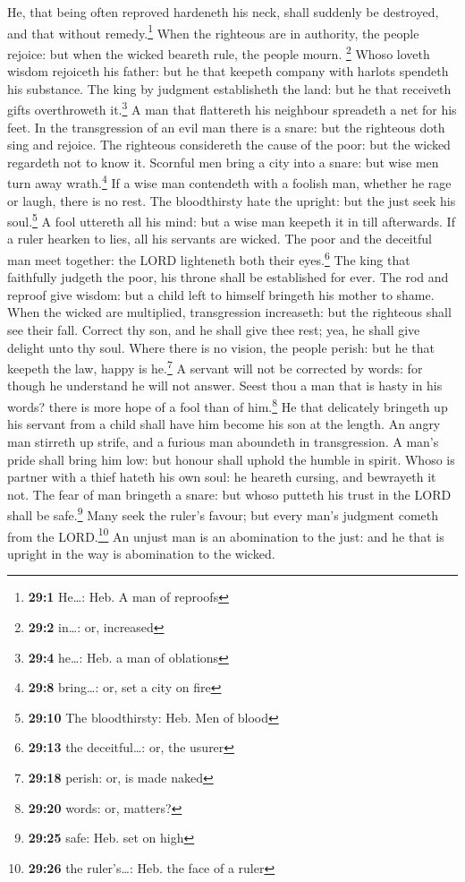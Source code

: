  He, that being often reproved hardeneth his neck, shall
suddenly be destroyed, and that without remedy.\footnote{\textbf{29:1}
  He\ldots: Heb. A man of reproofs}  When the righteous
are in authority, the people rejoice: but when the wicked beareth rule,
the people mourn. \footnote{\textbf{29:2} in\ldots: or, increased}
 Whoso loveth wisdom rejoiceth his father: but he that
keepeth company with harlots spendeth his substance.  The
king by judgment establisheth the land: but he that receiveth gifts
overthroweth it.\footnote{\textbf{29:4} he\ldots: Heb. a man of
  oblations}  A man that flattereth his neighbour
spreadeth a net for his feet.  In the transgression of an
evil man there is a snare: but the righteous doth sing and rejoice.
 The righteous considereth the cause of the poor: but the
wicked regardeth not to know it.  Scornful men bring a
city into a snare: but wise men turn away wrath.\footnote{\textbf{29:8}
  bring\ldots: or, set a city on fire}  If a wise man
contendeth with a foolish man, whether he rage or laugh, there is no
rest.  The bloodthirsty hate the upright: but the just
seek his soul.\footnote{\textbf{29:10} The bloodthirsty: Heb. Men of
  blood}  A fool uttereth all his mind: but a wise man
keepeth it in till afterwards.  If a ruler hearken to
lies, all his servants are wicked.  The poor and the
deceitful man meet together: the LORD lighteneth both their
eyes.\footnote{\textbf{29:13} the deceitful\ldots: or, the usurer}
 The king that faithfully judgeth the poor, his throne
shall be established for ever.  The rod and reproof give
wisdom: but a child left to himself bringeth his mother to shame.
 When the wicked are multiplied, transgression
increaseth: but the righteous shall see their fall. 
Correct thy son, and he shall give thee rest; yea, he shall give delight
unto thy soul.  Where there is no vision, the people
perish: but he that keepeth the law, happy is he.\footnote{\textbf{29:18}
  perish: or, is made naked}  A servant will not be
corrected by words: for though he understand he will not answer.
 Seest thou a man that is hasty in his words? there is
more hope of a fool than of him.\footnote{\textbf{29:20} words: or,
  matters?}  He that delicately bringeth up his servant
from a child shall have him become his son at the length.
 An angry man stirreth up strife, and a furious man
aboundeth in transgression.  A man's pride shall bring
him low: but honour shall uphold the humble in spirit. 
Whoso is partner with a thief hateth his own soul: he heareth cursing,
and bewrayeth it not.  The fear of man bringeth a snare:
but whoso putteth his trust in the LORD shall be safe.\footnote{\textbf{29:25}
  safe: Heb. set on high}  Many seek the ruler's favour;
but every man's judgment cometh from the LORD.\footnote{\textbf{29:26}
  the ruler's\ldots: Heb. the face of a ruler}  An unjust
man is an abomination to the just: and he that is upright in the way is
abomination to the wicked.

